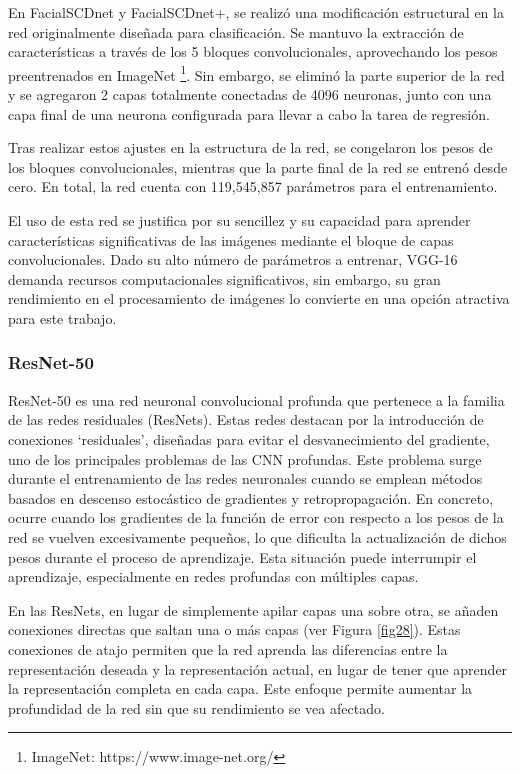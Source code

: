 En FacialSCDnet y FacialSCDnet+, se realizó una modificación estructural en la red originalmente diseñada para clasificación. Se mantuvo la extracción de características a través de los 5 bloques convolucionales, aprovechando los pesos preentrenados en ImageNet \footnote{ImageNet: https://www.image-net.org/}. Sin embargo, se eliminó la parte superior de la red y se agregaron 2 capas totalmente conectadas de 4096 neuronas, junto con una capa final de una neurona configurada para llevar a cabo la tarea de regresión.

Tras realizar estos ajustes en la estructura de la red, se congelaron los pesos de los bloques convolucionales, mientras que la parte final de la red se entrenó desde cero. En total, la red cuenta con 119,545,857 parámetros para el entrenamiento.

El uso de esta red se justifica por su sencillez y su capacidad para aprender características significativas de las imágenes mediante el bloque de capas convolucionales. Dado su alto número de parámetros a entrenar, VGG-16 demanda recursos computacionales significativos, sin embargo, su gran rendimiento en el procesamiento de imágenes lo convierte en una opción atractiva para este trabajo.

\subsubsection{ResNet-50}

ResNet-50 es una red neuronal convolucional profunda que pertenece a la familia de las redes residuales \cite{72} (ResNets). Estas redes destacan por la introducción de conexiones \enquote*{residuales}, diseñadas para evitar el desvanecimiento del gradiente, uno de los principales problemas de las CNN profundas.
Este problema surge durante el entrenamiento de las redes neuronales cuando se emplean métodos basados en descenso estocástico de gradientes y retropropagación. En concreto, ocurre cuando los gradientes de la función de error con respecto a los pesos de la red se vuelven excesivamente pequeños, lo que dificulta la actualización de dichos pesos durante el proceso de aprendizaje. Esta situación puede interrumpir el aprendizaje, especialmente en redes profundas con múltiples capas.

En las ResNets, en lugar de simplemente apilar capas una sobre otra, se añaden conexiones directas que saltan una o más capas (ver Figura \ref{fig28}). Estas conexiones de atajo permiten que la red aprenda las diferencias entre la representación deseada y la representación actual, en lugar de tener que aprender la representación completa en cada capa. Este enfoque permite aumentar la profundidad de la red sin que su rendimiento se vea afectado.

